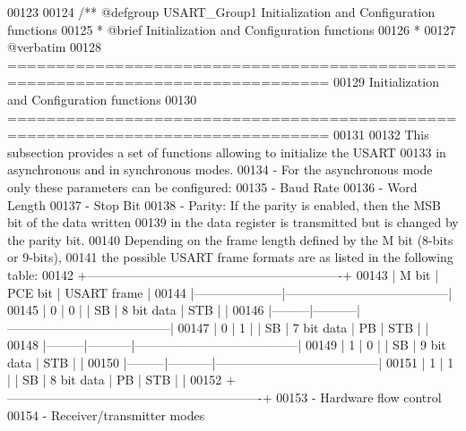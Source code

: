 \begin{DoxyCode}
00123 
00124 \textcolor{comment}{/** @defgroup USART\_Group1 Initialization and Configuration functions}
00125 \textcolor{comment}{ *  @brief   Initialization and Configuration functions }
00126 \textcolor{comment}{ *}
00127 \textcolor{comment}{@verbatim   }
00128 \textcolor{comment}{ ===============================================================================}
00129 \textcolor{comment}{                  Initialization and Configuration functions}
00130 \textcolor{comment}{ ===============================================================================  }
00131 \textcolor{comment}{}
00132 \textcolor{comment}{  This subsection provides a set of functions allowing to initialize the USART }
00133 \textcolor{comment}{  in asynchronous and in synchronous modes.}
00134 \textcolor{comment}{   - For the asynchronous mode only these parameters can be configured: }
00135 \textcolor{comment}{        - Baud Rate}
00136 \textcolor{comment}{        - Word Length }
00137 \textcolor{comment}{        - Stop Bit}
00138 \textcolor{comment}{        - Parity: If the parity is enabled, then the MSB bit of the data written}
00139 \textcolor{comment}{          in the data register is transmitted but is changed by the parity bit.}
00140 \textcolor{comment}{          Depending on the frame length defined by the M bit (8-bits or 9-bits),}
00141 \textcolor{comment}{          the possible USART frame formats are as listed in the following table:}
00142 \textcolor{comment}{   +-------------------------------------------------------------+     }
00143 \textcolor{comment}{   |   M bit |  PCE bit  |            USART frame                |}
00144 \textcolor{comment}{   |---------------------|---------------------------------------|             }
00145 \textcolor{comment}{   |    0    |    0      |    | SB | 8 bit data | STB |          |}
00146 \textcolor{comment}{   |---------|-----------|---------------------------------------|  }
00147 \textcolor{comment}{   |    0    |    1      |    | SB | 7 bit data | PB | STB |     |}
00148 \textcolor{comment}{   |---------|-----------|---------------------------------------|  }
00149 \textcolor{comment}{   |    1    |    0      |    | SB | 9 bit data | STB |          |}
00150 \textcolor{comment}{   |---------|-----------|---------------------------------------|  }
00151 \textcolor{comment}{   |    1    |    1      |    | SB | 8 bit data | PB | STB |     |}
00152 \textcolor{comment}{   +-------------------------------------------------------------+            }
00153 \textcolor{comment}{        - Hardware flow control}
00154 \textcolor{comment}{        - Receiver/transmitter modes}

\end{DoxyCode}
